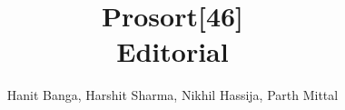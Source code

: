 \documentclass{article}
\title{Prosort[46]\\Editorial}
\author{Hanit Banga, Harshit Sharma, Nikhil Hassija, Parth Mittal}
\begin{document}
	\maketitle
	\tableofcontents

	
    \pagebreak
	
    \pagebreak
	
    \pagebreak
    
    \pagebreak
	
    \pagebreak
	

\pagebreak

\end{document}
